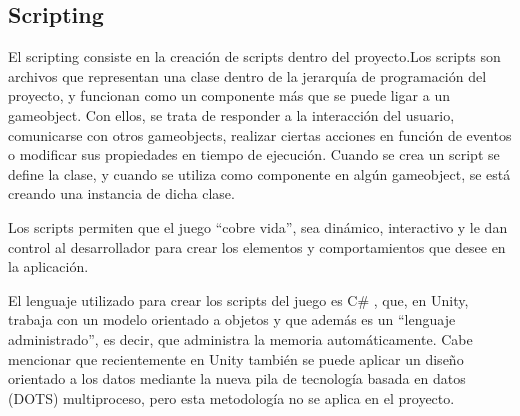 \subsection{Scripting} \label{Scripting}
El scripting consiste en la creación de scripts dentro del proyecto.Los scripts \cite{doc:Scripts} son archivos que representan una clase dentro de la jerarquía de programación del proyecto, y funcionan como un componente más que se puede ligar a un gameobject. Con ellos, se trata de responder a la interacción del usuario, comunicarse con otros gameobjects, realizar ciertas acciones en función de eventos o modificar sus propiedades en tiempo de ejecución. Cuando se crea un script se define la clase, y cuando se utiliza como componente en algún gameobject, se está creando una instancia de dicha clase.

Los scripts permiten que el juego ``cobre vida'', sea dinámico, interactivo y le dan control al desarrollador para crear los elementos y comportamientos que desee en la aplicación.

El lenguaje utilizado para crear los scripts del juego es C\# \cite{doc:CSharpUnity}, que, en Unity, trabaja con un modelo orientado a objetos y que además es un ``lenguaje administrado'', es decir, que administra la memoria automáticamente.
Cabe mencionar que recientemente en Unity también se puede aplicar un diseño orientado a los datos mediante la nueva pila de tecnología basada en datos (DOTS) multiproceso, pero esta metodología no se aplica en el proyecto.

